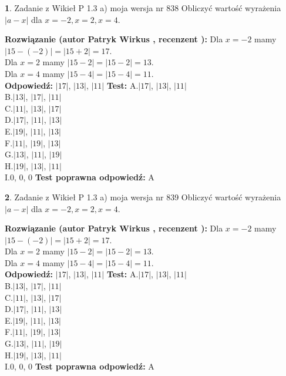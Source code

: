 \documentclass[12pt, a4paper]{article}
\theoremstyle{definition} %
\newtheorem{zad}{}
\newcommand{\zadStart}[1]{\begin{zad}#1\newline}
\newcommand{\zadStop}{\end{zad}}
\newcommand{\rozwStart}[2]{\noindent \textbf{Rozwiązanie (autor #1 , recenzent #2): }\newline}
\newcommand{\rozwStop}{\newline}
\newcommand{\odpStart}{\noindent \textbf{Odpowiedź:}\newline}
\newcommand{\odpStop}{\newline}
\newcommand{\testStart}{\noindent \textbf{Test:}\newline}
\newcommand{\testStop}{\newline}
\newcommand{\kluczStart}{\noindent \textbf{Test poprawna odpowiedź:}\newline}
\newcommand{\kluczStop}{\newline}
\begin{document}
\zadStart{Zadanie z Wikieł P 1.3 a) moja wersja nr 838}
Obliczyć wartość wyrażenia $|a - x|$ dla $x=-2,x=2,x=4$.
\zadStop
\rozwStart{Patryk Wirkus}{}
Dla $x = -2$ mamy $|15 - (-2)| = |15 + 2| = 17$.\\
Dla $x = 2$ mamy $|15 - 2| = |15 - 2| = 13$.\\
Dla $x = 4$ mamy $|15 - 4| = |15 - 4| = 11$.\\
\rozwStop
\odpStart
$|17|$, $|13|$, $|11|$
\odpStop
\testStart
A.$|17|$, $|13|$, $|11|$\\
B.$|13|$, $|17|$, $|11|$\\
C.$|11|$, $|13|$, $|17|$\\
D.$|17|$, $|11|$, $|13|$\\
E.$|19|$, $|11|$, $|13|$\\
F.$|11|$, $|19|$, $|13|$\\
G.$|13|$, $|11|$, $|19|$\\
H.$|19|$, $|13|$, $|11|$\\
I.$0$, $0$, $0$
\testStop
\kluczStart
A
\kluczStop



\zadStart{Zadanie z Wikieł P 1.3 a) moja wersja nr 839}
Obliczyć wartość wyrażenia $|a - x|$ dla $x=-2,x=2,x=4$.
\zadStop
\rozwStart{Patryk Wirkus}{}
Dla $x = -2$ mamy $|15 - (-2)| = |15 + 2| = 17$.\\
Dla $x = 2$ mamy $|15 - 2| = |15 - 2| = 13$.\\
Dla $x = 4$ mamy $|15 - 4| = |15 - 4| = 11$.\\
\rozwStop
\odpStart
$|17|$, $|13|$, $|11|$
\odpStop
\testStart
A.$|17|$, $|13|$, $|11|$\\
B.$|13|$, $|17|$, $|11|$\\
C.$|11|$, $|13|$, $|17|$\\
D.$|17|$, $|11|$, $|13|$\\
E.$|19|$, $|11|$, $|13|$\\
F.$|11|$, $|19|$, $|13|$\\
G.$|13|$, $|11|$, $|19|$\\
H.$|19|$, $|13|$, $|11|$\\
I.$0$, $0$, $0$
\testStop
\kluczStart
A
\kluczStop
\end{document}
